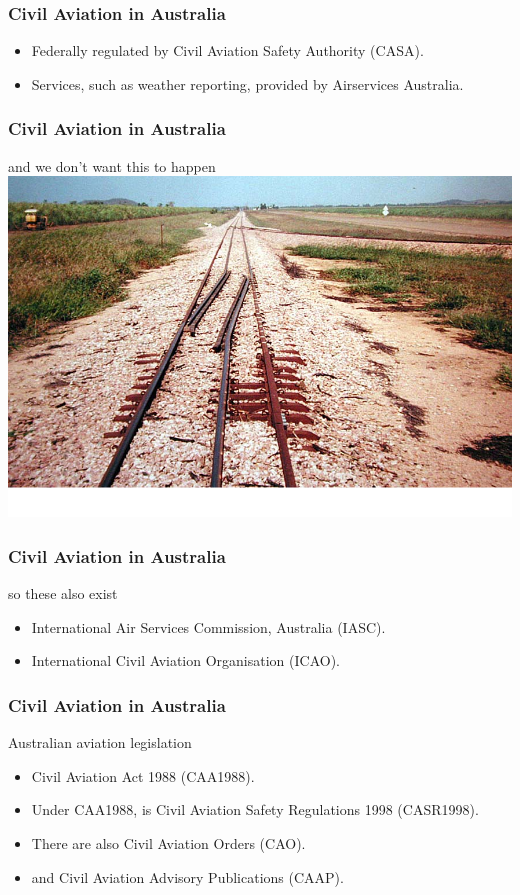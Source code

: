 \begin{frame}
\frametitle{Civil Aviation in Australia}
\begin{itemize}
\item<1-> Federally regulated by Civil Aviation Safety Authority (CASA).
\item<2-> Services, such as weather reporting, provided by Airservices
          Australia.
\end{itemize}
\end{frame}

\begin{frame}
\frametitle{Civil Aviation in Australia}
\begin{block}{and we don't want this to happen}
\includegraphics[height=0.5\textheight]{image/railway-gauge.png}
\end{block}
\end{frame}

\begin{frame}
\frametitle{Civil Aviation in Australia}
\begin{block}{so these also exist}
\begin{itemize}
\item<1-> International Air Services Commission, Australia (IASC).
\item<2-> International Civil Aviation Organisation (ICAO).
\end{itemize}
\end{block}
\end{frame}

\begin{frame}
\frametitle{Civil Aviation in Australia}
\begin{block}{Australian aviation legislation}
\begin{itemize}
\item<1-> Civil Aviation Act 1988 (CAA1988).
\item<2-> Under CAA1988, is Civil Aviation Safety Regulations 1998 (CASR1998).
\item<3-> There are also Civil Aviation Orders (CAO).
\item<4-> and Civil Aviation Advisory Publications (CAAP).
\end{itemize}
\end{block}
\end{frame}

